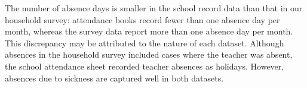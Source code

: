 \documentclass[fleqn,11pt]{article}
\newcommand{\sym}[1]{\rlap{$#1$}}
\def\sym#1{\ifmmode^{#1}\else\(^{#1}\)\fi
}
\begin{document}
The number of absence days is smaller in the school record data than that in our household survey: attendance books record fewer than one absence day per month, whereas the survey data report more than one absence day per month. This discrepancy may be attributed to the nature of each dataset. Although absences in the household survey included cases where the teacher was absent, the school attendance sheet recorded teacher absences as holidays. However, absences due to sickness are captured well in both datasets.





\end{document}
